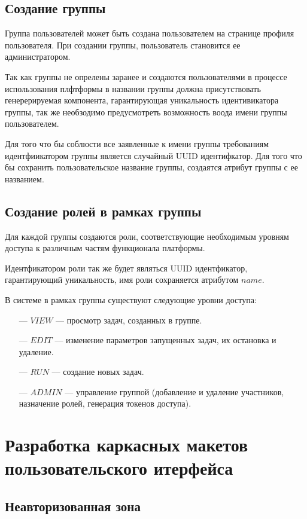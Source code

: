 \subsection{Создание группы}

Группа пользователей может быть создана пользователем на странице профиля пользователя. При создании группы, пользователь становится ее администратором.

Так как группы не опрелены заранее и создаются пользователями в процессе использования плфтформы в названии группы должна присутствовать генерерируемая компонента, гарантирующая уникальность идентивикатора группы, так же необзодимо предусмотреть возможность воода имени группы пользователем.

Для того что бы соблюсти все заявленные к имени группы требованиям идентфиикатором группы является случайный UUID идентифкатор. Для того что бы сохранить пользовательское название группы, создаятся атрибут группы с ее названием.

\subsection{Создание ролей в рамках группы}

Для каждой группы создаются роли, соответствующие необходимым уровням доступа к различным частям функционала платформы.

Идентфикатором роли так же будет являться UUID идентфикатор, гарантирующий уникальность, имя роли сохраняется атрибутом $name$.

В системе в рамках группы существуют следующие уровни доступа:

\begin{itemize}
  \item[---]$VIEW$ --– просмотр задач, созданных в группе.
  \item[---]$EDIT$ –-- изменение параметров запущенных задач, их остановка и удаление.
  \item[---]$RUN$ –-- создание новых задач.
  \item[---]$ADMIN$ –-- управление группой (добавление и удаление участников, назначение ролей, генерация токенов доступа).
\end{itemize}

\section{Разработка каркасных макетов пользовательского итерфейса}

\subsection{Неавторизованная зона}

